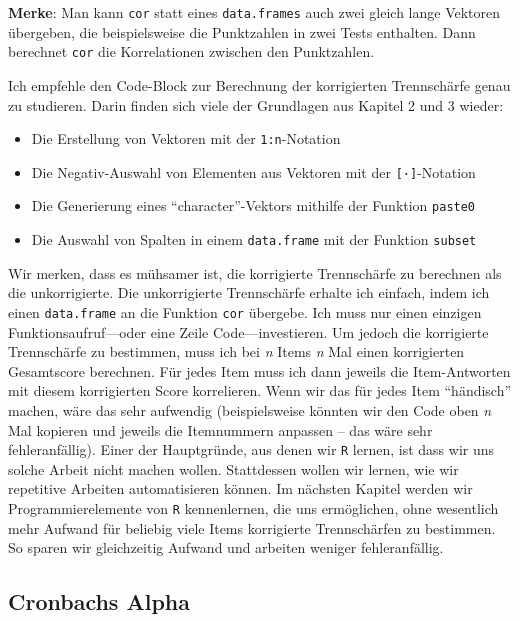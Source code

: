 \documentclass[12pt,]{tufte-book}
\providecommand{\tightlist}{%
  \setlength{\itemsep}{0pt}\setlength{\parskip}{0pt}}
\theoremstyle{definition}
\theoremstyle{definition}
\theoremstyle{definition}
\theoremstyle{remark}
\begin{document}
\begin{marginfigure}
\textbf{Merke}: Man kann \texttt{cor} statt eines \texttt{data.frames}
auch zwei gleich lange Vektoren übergeben, die beispielsweise die
Punktzahlen in zwei Tests enthalten. Dann berechnet \texttt{cor} die
Korrelationen zwischen den Punktzahlen.
\end{marginfigure}

Ich empfehle den Code-Block zur Berechnung der korrigierten Trennschärfe
genau zu studieren. Darin finden sich viele der Grundlagen aus Kapitel 2
und 3 wieder:

\begin{itemize}
\tightlist
\item
  Die Erstellung von Vektoren mit der \texttt{1:n}-Notation
\item
  Die Negativ-Auswahl von Elementen aus Vektoren mit der
  \texttt{{[}·{]}}-Notation
\item
  Die Generierung eines ``character''-Vektors mithilfe der Funktion
  \texttt{paste0}
\item
  Die Auswahl von Spalten in einem \texttt{data.frame} mit der Funktion
  \texttt{subset}
\end{itemize}

Wir merken, dass es mühsamer ist, die korrigierte Trennschärfe zu
berechnen als die unkorrigierte. Die unkorrigierte Trennschärfe erhalte
ich einfach, indem ich einen \texttt{data.frame} an die Funktion
\texttt{cor} übergebe. Ich muss nur einen einzigen
Funktionsaufruf---oder eine Zeile Code---investieren. Um jedoch die
korrigierte Trennschärfe zu bestimmen, muss ich bei \emph{n} Items
\emph{n} Mal einen korrigierten Gesamtscore berechnen. Für jedes Item
muss ich dann jeweils die Item-Antworten mit diesem korrigierten Score
korrelieren. Wenn wir das für jedes Item ``händisch'' machen, wäre das
sehr aufwendig (beispielsweise könnten wir den Code oben \emph{n} Mal
kopieren und jeweils die Itemnummern anpassen -- das wäre sehr
fehleranfällig). Einer der Hauptgründe, aus denen wir \texttt{R} lernen,
ist dass wir uns solche Arbeit nicht machen wollen. Stattdessen wollen
wir lernen, wie wir repetitive Arbeiten automatisieren können. Im
nächsten Kapitel werden wir Programmierelemente von \texttt{R}
kennenlernen, die uns ermöglichen, ohne wesentlich mehr Aufwand für
beliebig viele Items korrigierte Trennschärfen zu bestimmen. So sparen
wir gleichzeitig Aufwand und arbeiten weniger fehleranfällig.

\subsection{Cronbachs Alpha}\label{cronbachs-alpha}
\end{document}

